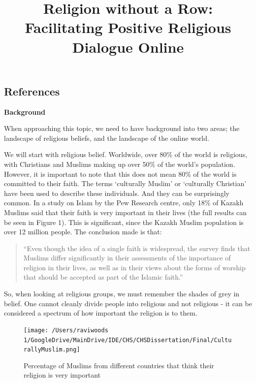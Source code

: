 \documentclass[]{article}
\date{}
\begin{document}
\tableofcontents
\subsection{References}
\nocite{*} 
\printbibliography[heading=none]

\title{Religion without a Row: Facilitating Positive Religious Dialogue
Online}


\newpage 

\textbf{Background}

When approaching this topic, we need to have background into two areas;
the landscape of religious beliefs, and the landscape of the online
world.

We will start with religious belief. Worldwide, over 80\% of the world
is religious, with Christians and Muslims making up over 50\% of the
world's population\autocite{HackettChristiansremainworld2017}. However,
it is important to note that this does not mean 80\% of the world is
committed to their faith. The terms `culturally Muslim' or `culturally
Christian' have been used to describe these individuals. And they can be
surprisingly common. In a study on Islam by the Pew Research
centre\autocite{PewResearchCenterWorldMuslimsUnity2012}, only 18\% of
Kazakh Muslims said that their faith is very important in their lives
(the full results can be seen in Figure 1). This is significant, since
the Kazakh Muslim population is over 12 million people. The conclusion
made is that:

\begin{quote}
``Even though the idea of a single faith is widespread, the survey finds
that Muslims differ significantly in their assessments of the importance
of religion in their lives, as well as in their views about the forms of
worship that should be accepted as part of the Islamic
faith.''\autocite[pg 16]{PewResearchCenterWorldMuslimsUnity2012}
\end{quote}

So, when looking at religious groups, we must remember the shades of
grey in belief. One cannot cleanly divide people into religious and not
religious - it can be considered a spectrum of how important the
religion is to them.

\begin{figure}
\centering
\texttt{[image: /Users/raviwoods 1/GoogleDrive/MainDrive/IDE/CHS/CHSDissertation/Final/CulturallyMuslim.png]}
\caption{Percentage of Muslims from different countries that think their
religion is very
important\autocite[pg 8]{PewResearchCenterWorldMuslimsUnity2012}}
\end{figure}
\end{document}
